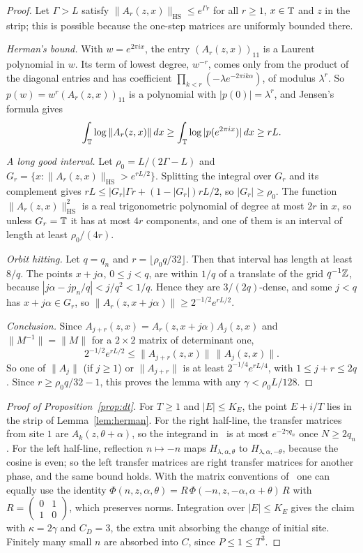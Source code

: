 \begin{proof}
Let $\Gamma>L$ satisfy $\|A_r(z,x)\|_{\mathrm{HS}}\le e^{\Gamma r}$ for all $r\ge1$, $x\in\mathbb T$ and $z$ in the strip; this is possible because the one-step matrices are uniformly bounded there.

\emph{Herman's bound.} With $w=e^{2\pi ix}$, the entry $(A_r(z,x))_{11}$ is a Laurent polynomial in $w$. Its term of lowest degree, $w^{-r}$, comes only from the product of the diagonal entries and has coefficient $\prod_{k<r}(-\lambda e^{-2\pi ik\alpha})$, of modulus $\lambda^r$. So $p(w)=w^r(A_r(z,x))_{11}$ is a polynomial with $|p(0)|=\lambda^r$, and Jensen's formula gives
\[
\int_\mathbb T\log\|A_r(z,x)\|\,dx\ge\int_\mathbb T\log|p(e^{2\pi ix})|\,dx\ge rL.
\]

\emph{A long good interval.} Let $\rho_0=L/(2\Gamma-L)$ and $G_r=\{x:\|A_r(z,x)\|_{\mathrm{HS}}>e^{rL/2}\}$. Splitting the integral over $G_r$ and its complement gives $rL\le|G_r|\Gamma r+(1-|G_r|)rL/2$, so $|G_r|\ge\rho_0$. The function $\|A_r(z,x)\|_{\mathrm{HS}}^2$ is a real trigonometric polynomial of degree at most $2r$ in $x$, so unless $G_r=\mathbb T$ it has at most $4r$ components, and one of them is an interval of length at least $\rho_0/(4r)$.

\emph{Orbit hitting.} Let $q=q_n$ and $r=\lfloor\rho_0q/32\rfloor$. Then that interval has length at least $8/q$. The points $x+j\alpha$, $0\le j<q$, are within $1/q$ of a translate of the grid $q^{-1}\mathbb Z$, because $|j\alpha-jp_n/q|<j/q^2<1/q$. Hence they are $3/(2q)$-dense, and some $j<q$ has $x+j\alpha\in G_r$, so $\|A_r(z,x+j\alpha)\|\ge2^{-1/2}e^{rL/2}$.

\emph{Conclusion.} Since $A_{j+r}(z,x)=A_r(z,x+j\alpha)A_j(z,x)$ and $\|M^{-1}\|=\|M\|$ for a $2\times2$ matrix of determinant one,
\[
2^{-1/2}e^{rL/2}\le\|A_{j+r}(z,x)\|\,\|A_j(z,x)\|.
\]
So one of $\|A_j\|$ (if $j\ge1$) or $\|A_{j+r}\|$ is at least $2^{-1/4}e^{rL/4}$, with $1\le j+r\le2q$. Since $r\ge\rho_0q/32-1$, this proves the lemma with any $\gamma<\rho_0L/128$.
\end{proof}

\begin{proof}[Proof of Proposition~\ref{prop:dt}]
For $T\ge1$ and $|E|\le K_E$, the point $E+i/T$ lies in the strip of Lemma~\ref{lem:herman}. For the right half-line, the transfer matrices from site $1$ are $A_k(z,\theta+\alpha)$, so the integrand in~\cite[Theorem~7]{DT2007} is at most $e^{-2\gamma q_n}$ once $N\ge2q_n$. For the left half-line, reflection $n\mapsto-n$ maps $H_{\lambda,\alpha,\theta}$ to $H_{\lambda,\alpha,-\theta}$, because the cosine is even; so the left transfer matrices are right transfer matrices for another phase, and the same bound holds. With the matrix conventions of~\cite{DT2007} one can equally use the identity $\Phi(n,z,\alpha,\theta)=R\,\Phi(-n,z,-\alpha,\alpha+\theta)\,R$ with $R=\begin{pmatrix}0&1\\1&0\end{pmatrix}$, which preserves norms. Integration over $|E|\le K_E$ gives the claim with $\kappa=2\gamma$ and $C_D=3$, the extra unit absorbing the change of initial site. Finitely many small $n$ are absorbed into $C$, since $P\le1\le T^3$.
\end{proof}
